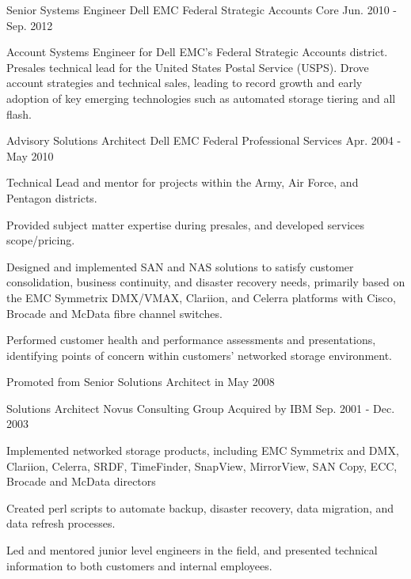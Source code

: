 \begin{cventries}

\cventry
{Senior Systems Engineer} %
{Dell EMC} %
{Federal Strategic Accounts Core} %
{Jun. 2010 - Sep. 2012} %
{ %
\begin{cvitems}
Account Systems Engineer for Dell EMC's Federal Strategic Accounts district. Presales technical lead for the United States Postal Service (USPS). Drove account strategies and technical sales, leading to record growth and early adoption of key emerging technologies such as automated storage tiering and all flash.
\end{cvitems}
}


\cventry
{Advisory Solutions Architect} %
{Dell EMC} %
{Federal Professional Services} %
{Apr. 2004 - May 2010} %
{ %
\begin{cvitems}
\item {Technical Lead and mentor for projects within the Army, Air Force, and Pentagon districts.}
\item {Provided subject matter expertise during presales, and developed services scope/pricing.}
\item {Designed and implemented SAN and NAS solutions to satisfy customer consolidation, business continuity, and disaster recovery needs, primarily based on the EMC Symmetrix DMX/VMAX, Clariion, and Celerra platforms with Cisco, Brocade and McData fibre channel switches.}
\item {Performed customer health and performance assessments and presentations, identifying points of concern within customers’ networked storage environment.}
\item {Promoted from Senior Solutions Architect in May 2008}
\end{cvitems}
}


\cventry
{Solutions Architect} %
{Novus Consulting Group} %
{Acquired by IBM} %
{Sep. 2001 - Dec. 2003} %
{ %
\begin{cvitems}
\item {Implemented networked storage products, including EMC Symmetrix and DMX, Clariion, Celerra, SRDF, TimeFinder, SnapView, MirrorView, SAN Copy, ECC, Brocade and McData directors}
\item {Created perl scripts to automate backup, disaster recovery, data migration, and data refresh processes.}
\item {Led and mentored junior level engineers in the field, and presented technical information to both customers and internal employees.}
\end{cvitems}
}


\end{cventries}
